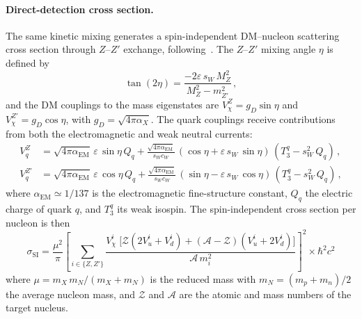 \documentclass[11pt]{article}
\numberwithin{equation}{section}
\newcommand{\mX}{m_X}
\newcommand{\alphaX}{\alpha_X}
\newcommand{\alphaEM}{\alpha_{\text{EM}}}
\newcommand{\epsX}{\varepsilon}
\begin{document}
\paragraph{Direct-detection cross section.}
The same kinetic mixing generates a spin-independent DM--nucleon scattering cross section through $Z$--$Z'$ exchange, following~\cite{Hu:2025thq}. The $Z$--$Z'$ mixing angle $\eta$ is defined by
\begin{equation}
    \tan(2\eta) = \frac{-2\epsX\,s_W\,M_Z^2}{M_Z^2 - m_{Z'}^2}\,,
\end{equation}
and the DM couplings to the mass eigenstates are $V_\chi^Z = g_D\sin\eta$ and $V_\chi^{Z'} = g_D\cos\eta$, with $g_D = \sqrt{4\pi\alphaX}$. The quark couplings receive contributions from both the electromagnetic and weak neutral currents:
\begin{align}
    V_q^Z &= \sqrt{4\pi\alphaEM}\,\epsX\,\sin\eta\,Q_q + \frac{\sqrt{4\pi\alphaEM}}{s_W c_W}\,(\cos\eta + \epsX\,s_W\,\sin\eta)\,(T_3^q - s_W^2\,Q_q)\,, \\
    V_q^{Z'} &= \sqrt{4\pi\alphaEM}\,\epsX\,\cos\eta\,Q_q + \frac{\sqrt{4\pi\alphaEM}}{s_W c_W}\,(\sin\eta - \epsX\,s_W\,\cos\eta)\,(T_3^q - s_W^2\,Q_q)\,,
\end{align}
where $\alphaEM \simeq 1/137$ is the electromagnetic fine-structure constant, $Q_q$ the electric charge of quark $q$, and $T_3^q$ its weak isospin. The spin-independent cross section per nucleon is then
\begin{equation}
    \sigma_{\text{SI}} = \frac{\mu^2}{\pi}\left[\sum_{i\in\{Z,Z'\}}\frac{V_\chi^i\;\big[\mathcal{Z}(2V_u^i + V_d^i) + (\mathcal{A}-\mathcal{Z})(V_u^i + 2V_d^i)\big]}{\mathcal{A}\,m_i^2}\right]^2 \times \hbar^2 c^2
    \label{eq:VP_sigma_SI}
\end{equation}
where $\mu = \mX\,m_N/(\mX + m_N)$ is the reduced mass with $m_N = (m_p + m_n)/2$ the average nucleon mass, and $\mathcal{Z}$ and $\mathcal{A}$ are the atomic and mass numbers of the target nucleus.
\end{document}
